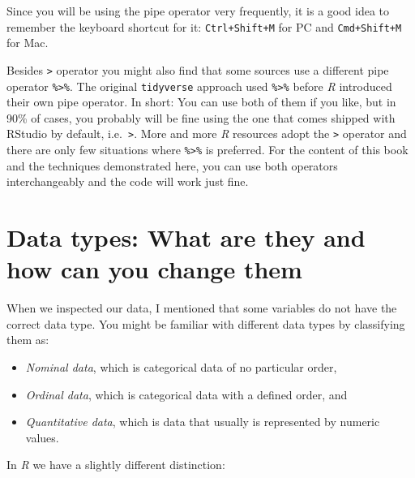 \documentclass[
  letterpaper,
]{krantz}
\begin{document}
Since you will be using the pipe operator very frequently, it is a good
idea to remember the keyboard shortcut for it: \texttt{Ctrl+Shift+M} for
PC and \texttt{Cmd+Shift+M} for Mac.

Besides \texttt{\textbar{}\textgreater{}} operator you might also find
that some sources use a different pipe operator
\texttt{\%\textgreater{}\%}. The original \texttt{tidyverse} approach
used \texttt{\%\textgreater{}\%} before \emph{R} introduced their own
pipe operator. In short: You can use both of them if you like, but in
90\% of cases, you probably will be fine using the one that comes
shipped with RStudio by default, i.e.~\texttt{\textbar{}\textgreater{}}.
More and more \emph{R} resources adopt the
\texttt{\textbar{}\textgreater{}} operator and there are only few
situations where \texttt{\%\textgreater{}\%} is preferred. For the
content of this book and the techniques demonstrated here, you can use
both operators interchangeably and the code will work just fine.

\section{Data types: What are they and how can you change
them}\label{sec-change-data-types}

When we inspected our data, I mentioned that some variables do not have
the correct data type. You might be familiar with different data types
by classifying them as:

\begin{itemize}
\item
  \emph{Nominal data}, which is categorical data of no particular order,
\item
  \emph{Ordinal data}, which is categorical data with a defined order,
  and
\item
  \emph{Quantitative data}, which is data that usually is represented by
  numeric values.
\end{itemize}

In \emph{R} we have a slightly different distinction:
\end{document}
